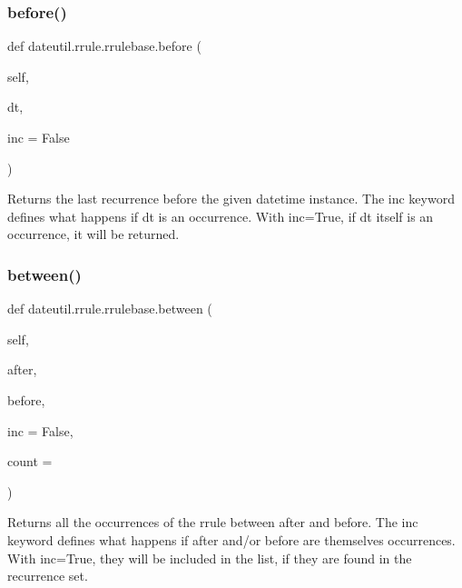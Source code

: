 \subsubsection{\texorpdfstring{before()}{before()}}
{\footnotesize\ttfamily def dateutil.\+rrule.\+rrulebase.\+before (\begin{DoxyParamCaption}\item[{}]{self,  }\item[{}]{dt,  }\item[{}]{inc = {\ttfamily False} }\end{DoxyParamCaption})}

\begin{DoxyVerb}Returns the last recurrence before the given datetime instance. The
    inc keyword defines what happens if dt is an occurrence. With
    inc=True, if dt itself is an occurrence, it will be returned. \end{DoxyVerb}
 \mbox{\label{classdateutil_1_1rrule_1_1rrulebase_aeda40011e55697486047552e4bd7237e}} 
\subsubsection{\texorpdfstring{between()}{between()}}
{\footnotesize\ttfamily def dateutil.\+rrule.\+rrulebase.\+between (\begin{DoxyParamCaption}\item[{}]{self,  }\item[{}]{after,  }\item[{}]{before,  }\item[{}]{inc = {\ttfamily False},  }\item[{}]{count = {} }\end{DoxyParamCaption})}

\begin{DoxyVerb}Returns all the occurrences of the rrule between after and before.
The inc keyword defines what happens if after and/or before are
themselves occurrences. With inc=True, they will be included in the
list, if they are found in the recurrence set. \end{DoxyVerb}
 \mbox{\label{classdateutil_1_1rrule_1_1rrulebase_ac37491765633ca2bdd968b0d0c763be7}} 
